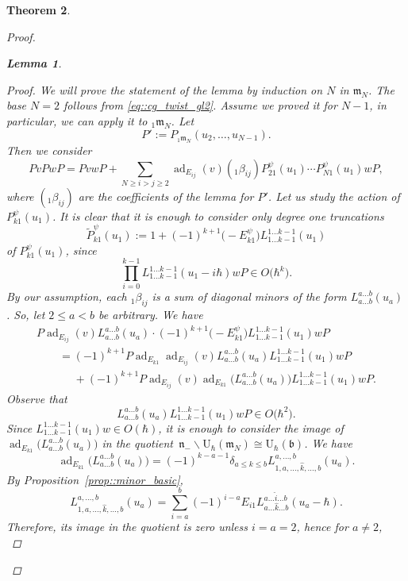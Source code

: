 \documentclass[pdftex]{sigma}
\numberwithin{equation}{section}
\newtheorem{Theorem}{Theorem}[section]
\newtheorem{Lemma}[Theorem]{Lemma}
\newcommand{\U}{\mathrm{U}_{\hbar}}
\renewcommand{\b}{\mathfrak{b}}
\newcommand{\n}{\mathfrak{n}}
\newcommand{\m}{\mathfrak{m}}
\DeclareMathOperator{\ad}{ad}
\begin{document}
\begin{Theorem}
\begin{proof}
\begin{Lemma}
\begin{proof}
					We will prove the statement of the lemma by induction on $N$ in $\m_N$. The base $N=2$ follows from \eqref{eq::cg_twist_gl2}. Assume we proved it for $N-1$, in particular, we can apply it to ${}_1\m_N$. Let
					\[
					P' := P_{{}_1\m_N} (u_2,\dots, u_{N-1}).
					\]
					Then we consider
					\[
					PvPwP = PvwP + \sum\limits_{N\geq i > j \geq 2} \ad_{E_{ij}}(v) ({}_1\beta_{ij}) P_{21}^{\psi}(u_1) \cdots P_{N1}^{\psi}(u_1) wP,
					\]
					where $({}_1\beta_{ij})$ are the coefficients of the lemma for $P'$. Let us study the action of $P_{k1}^{\psi}(u_1)$. It is clear that it is enough to consider only degree one truncations
					\[
					\tilde{P}_{k1}^{\psi}(u_1) := 1 + (-1)^{k+1} \bigl(-E_{k1}^{\psi}\bigr) L_{1\dots k-1}^{1\dots k-1}(u_1)
					\]
					of $P_{k1}^{\psi}(u_1)$, since
					\[
					\prod_{i=0}^{k-1} L_{1\dots k-1}^{1\dots k-1}(u_1 - i\hbar)wP \in O\bigl(\hbar^k\bigr).
					\]
					By our assumption, each ${}_1\beta_{ij}$ is a sum of diagonal minors of the form $L_{a\dots b}^{a\dots b}(u_a)$. So, let $2 \leq a < b$ be arbitrary. We have
					\begin{gather*}
						P\ad_{E_{ij}}(v) L_{a \dots b}^{a\dots b}(u_a) \cdot (-1)^{k+1} \bigl(-E_{k1}^{\psi}\bigr) L_{1\dots k-1}^{1\dots k-1}(u_1) wP \\
						\qquad= (-1)^{k+1} P \ad_{E_{k1}} \ad_{E_{ij}}(v) L_{a\dots b}^{a\dots b}(u_a) L_{1\dots k-1}^{1\dots k-1}(u_1) wP \\
						\phantom{\qquad=}{}+ (-1)^{k+1} P \ad_{E_{ij}}(v) \ad_{E_{k1}} \bigl(L_{a\dots b}^{a \dots b}(u_a)\bigr) L_{1\dots k-1}^{1\dots k-1}(u_1)wP.
					\end{gather*}
					Observe that
					\[
					L_{a\dots b}^{a\dots b}(u_a) L_{1\dots k-1}^{1\dots k-1}(u_1) wP \in O\bigl(\hbar^2\bigr).
					\]
					Since $L_{1\dots k-1}^{1\dots k-1}(u_1)w \in O(\hbar)$, it is enough to consider the image of $\ad_{E_{k1}}\bigl(L_{a\dots b}^{a\dots b}(u_a)\bigr) $ in the quotient~${\n_- \backslash \U(\m_N) \cong \U(\b)}$.
					We have
					\[
					\ad_{E_{k1}}\bigl(L_{a\dots b}^{a\dots b}(u_a)\bigr) = (-1)^{k-a-1}\delta_{a \leq k \leq b} L_{1,a,\dots,\hat{k},\dots,b}^{a,\dots,b}(u_a).
					\]
					By Proposition~\ref{prop::minor_basic},
					\[
					L_{1,a,\dots,\hat{k},\dots,b}^{a,\dots,b}(u_a) = \sum\limits_{i=a}^b (-1)^{i-a} E_{i1} L_{a\dots \hat{k} \dots b}^{a\dots \hat{i} \dots b}(u_a-\hbar).
					\]
					Therefore, its image in the quotient is zero unless $i=a=2$, hence for $a\not= 2$,
					\begin{equation}
						\label{eq::not_two_no_contribution}

\end{equation}
\end{proof}
\end{Lemma}
\end{proof}
\end{Theorem}
\end{document}
